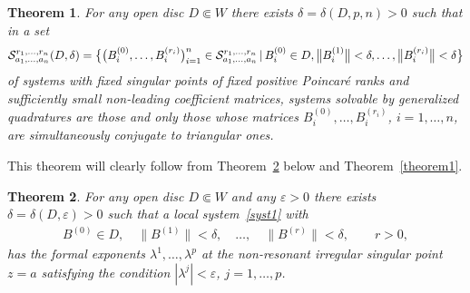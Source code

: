 \documentclass[pdftex]{sigma}
\numberwithin{equation}{section}
\newtheorem{Theorem}{Theorem}[section]
\begin{document}
\begin{Theorem}\label{theorem4}
For any open disc $D\Subset W$ there exists $\delta=\delta(D,p,n)>0$ such that in a set
\begin{gather*}
{\cal S}_{a_1,\ldots,a_n}^{r_1,\ldots,r_n}(D,\delta)=\bigl\{ \big(B^{(0)}_i,\ldots,B^{(r_i)}_i\big)_{i=1}^n \in
{\cal S}_{a_1,\ldots,a_n}^{r_1,\ldots,r_n} \,|\, B^{(0)}_i \in D, \big\|B^{(1)}_i\big\|<\delta,\ldots,\big\|B^{(r_i)}_i\big\|<\delta\bigr\}
\end{gather*}
of systems with fixed singular points of fixed positive Poincar\'e ranks and sufficiently small non-leading coefficient matrices, systems solvable by generalized quadratures are those and only those whose matrices $B^{(0)}_i,\ldots,B^{(r_i)}_i$, $i=1,\ldots,n$, are simultaneously conjugate to triangular ones.
\end{Theorem}

This theorem will clearly follow from Theorem~\ref{theorem5} below and Theorem~\ref{theorem1}.

\begin{Theorem}\label{theorem5}
For any open disc $D\Subset W$ and any $\varepsilon>0$ there exists $\delta=\delta(D,\varepsilon)>0$ such that a local system~\eqref{syst1} with
\begin{gather*}
B^{(0)}\in D, \quad \big\|B^{(1)}\big\|<\delta, \quad \ldots, \quad \big\|B^{(r)}\big\|<\delta, \qquad r>0,
\end{gather*}
has the formal exponents $\lambda^1,\ldots,\lambda^p$ at the non-resonant irregular singular point $z=a$ satisfying the condition $|\lambda^j|<\varepsilon$, $j=1,\ldots,p$.
\end{Theorem}
\end{document}
